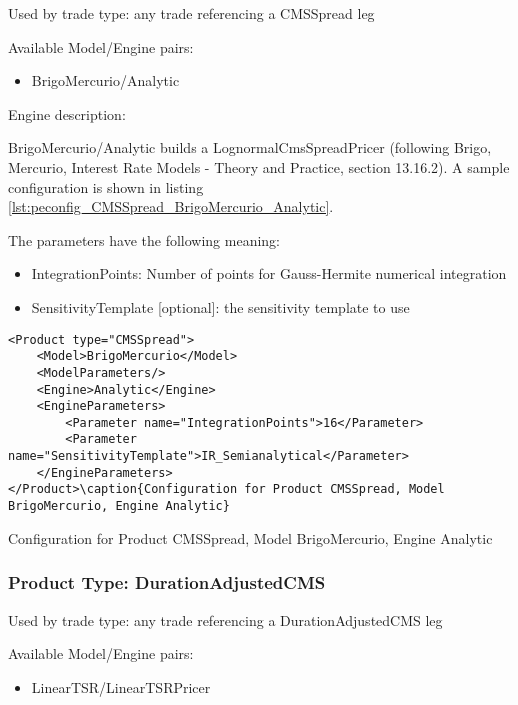 Used by trade type: any trade referencing a CMSSpread leg

Available Model/Engine pairs:

\begin{itemize}
  \item BrigoMercurio/Analytic
\end{itemize}

Engine description:

BrigoMercurio/Analytic builds a LognormalCmsSpreadPricer (following Brigo, Mercurio, Interest Rate Models - Theory and
Practice, section 13.16.2). A sample configuration is shown in listing
\ref{lst:peconfig_CMSSpread_BrigoMercurio_Analytic}.

The parameters have the following meaning:

\begin{itemize}
\item IntegrationPoints: Number of points for Gauss-Hermite numerical integration
\item SensitivityTemplate [optional]: the sensitivity template to use 
\end{itemize}

\begin{longlisting}
\begin{verbatim}
<Product type="CMSSpread">
    <Model>BrigoMercurio</Model>
    <ModelParameters/>
    <Engine>Analytic</Engine>
    <EngineParameters>
        <Parameter name="IntegrationPoints">16</Parameter>
        <Parameter name="SensitivityTemplate">IR_Semianalytical</Parameter>
    </EngineParameters>
</Product>\caption{Configuration for Product CMSSpread, Model BrigoMercurio, Engine Analytic}
\end{verbatim}
\caption{Configuration for Product CMSSpread, Model BrigoMercurio, Engine Analytic}
\label{lst:peconfig_CMSSpread_BrigoMercurio_Analytic}
\end{longlisting}

\subsubsection{Product Type: DurationAdjustedCMS}

Used by trade type: any trade referencing a DurationAdjustedCMS leg

Available Model/Engine pairs:

\begin{itemize}
  \item LinearTSR/LinearTSRPricer
\end{itemize}


